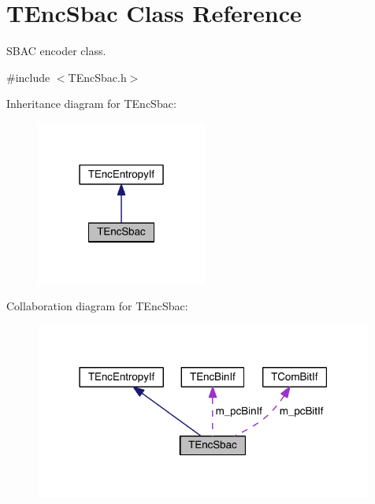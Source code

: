 \hypertarget{class_t_enc_sbac}{}\section{T\+Enc\+Sbac Class Reference}
\label{class_t_enc_sbac}


S\+B\+AC encoder class.  




{\ttfamily \#include $<$T\+Enc\+Sbac.\+h$>$}



Inheritance diagram for T\+Enc\+Sbac\+:
\nopagebreak
\begin{figure}[H]
\begin{center}
\leavevmode
\includegraphics[width=159pt]{d6/d08/class_t_enc_sbac__inherit__graph}
\end{center}
\end{figure}


Collaboration diagram for T\+Enc\+Sbac\+:
\nopagebreak
\begin{figure}[H]
\begin{center}
\leavevmode
\includegraphics[width=315pt]{da/df5/class_t_enc_sbac__coll__graph}
\end{center}
\end{figure}
